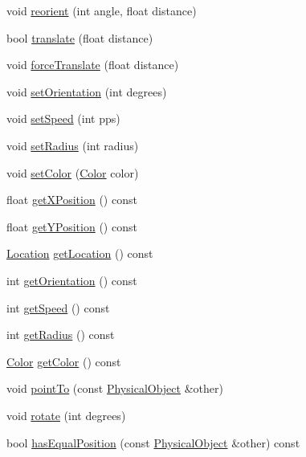 \begin{DoxyCompactItemize}
void \hyperlink{classPhysicalObject_a6e580010f7b025beacdee13835c8a726}{reorient} (int angle, float distance)
\item 
bool \hyperlink{classPhysicalObject_a2246c1f65d47638f61c2996d477efc6f}{translate} (float distance)
\item 
void \hyperlink{classPhysicalObject_a7121bd6642a98adc38e8c3348c4a3e01}{force\-Translate} (float distance)
\item 
void \hyperlink{classPhysicalObject_ac78eb70d7b7d24a586e5eed347f3a8d2}{set\-Orientation} (int degrees)
\item 
void \hyperlink{classPhysicalObject_ae197cc719763a64d34fc9723458aab01}{set\-Speed} (int pps)
\item 
void \hyperlink{classPhysicalObject_a81be6f4317d6813ab0b73ccf00da181a}{set\-Radius} (int radius)
\item 
void \hyperlink{classPhysicalObject_a2f5bff48537b44f6f1abd4500c644bc8}{set\-Color} (\hyperlink{structColor}{Color} color)
\item 
float \hyperlink{classPhysicalObject_a37bacbedf0b90865403149a1396ee58f}{get\-X\-Position} () const 
\item 
float \hyperlink{classPhysicalObject_a95b02cbe019cc2f968eb482487b5db7e}{get\-Y\-Position} () const 
\item 
\hyperlink{structLocation}{Location} \hyperlink{classPhysicalObject_a92b2b2addc7f85396c19fc255393e558}{get\-Location} () const 
\item 
int \hyperlink{classPhysicalObject_ac6d9bb140bcf0e492a0792e3eadbb3a8}{get\-Orientation} () const 
\item 
int \hyperlink{classPhysicalObject_a1f687df65cf05bed55a43edfda87790d}{get\-Speed} () const 
\item 
int \hyperlink{classPhysicalObject_a311d08aaa4bc7c863d0349397b187e6c}{get\-Radius} () const 
\item 
\hyperlink{structColor}{Color} \hyperlink{classPhysicalObject_aad8e15d2bec5e7c4fd38c2a8335dc0a0}{get\-Color} () const 
\item 
void \hyperlink{classPhysicalObject_aa4e04a3becfa1be5b3fea856a2f0c3fb}{point\-To} (const \hyperlink{classPhysicalObject}{Physical\-Object} \&other)
\item 
void \hyperlink{classPhysicalObject_abb08525b7fa5fa7f3b936847c28bb630}{rotate} (int degrees)
\item 
bool \hyperlink{classPhysicalObject_a2bfa9e53acb308cdbfdda0945a8b1fe3}{has\-Equal\-Position} (const \hyperlink{classPhysicalObject}{Physical\-Object} \&other) const 

\end{DoxyCompactItemize}
